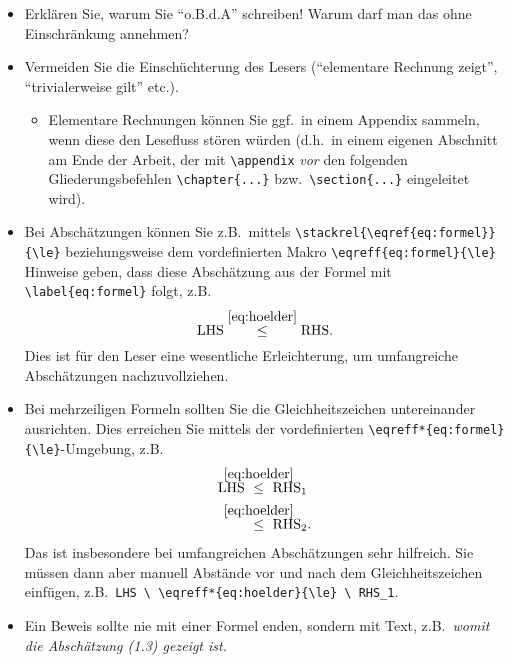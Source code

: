 \documentclass[../main.tex]{subfiles}
\begin{document}
\begin{itemize}
  \item Erklären Sie, warum Sie "`o.B.d.A"' schreiben! Warum darf man das ohne Einschrän\-kung annehmen?

  \item Vermeiden Sie die Einschüchterung des Lesers ("`elementare Rechnung zeigt"', "`trivialerweise gilt"' etc.).
        \begin{itemize}
          \item Elementare Rechnungen können Sie ggf.\ in einem Appendix sammeln, wenn diese den Lesefluss stören würden (d.h.\ in einem eigenen Abschnitt am Ende der Arbeit, der mit \verb$\appendix$ \emph{vor} den folgenden Gliederungsbefehlen \verb$\chapter{...}$ bzw.\ \verb$\section{...}$ eingeleitet wird).
        \end{itemize}

  \item Bei Abschätzungen können Sie z.B.\ mittels \verb$\stackrel{\eqref{eq:formel}}{\le}$ beziehungsweise dem vordefinierten Makro \verb$\eqreff{eq:formel}{\le}$ Hinweise geben, dass diese Abschätzung aus der Formel mit \verb$\label{eq:formel}$ folgt, z.B.
        \begin{equation*}
          \textup{LHS} \eqreff{eq:hoelder}{\le} \textup{RHS}.
        \end{equation*}
        Dies ist für den Leser eine wesentliche Erleichterung, um umfangreiche Abschätzungen nachzuvollziehen.

  \item Bei mehrzeiligen Formeln sollten Sie die Gleichheitszeichen untereinander ausrichten. Dies erreichen Sie mittels der vordefinierten \verb$\eqreff*{eq:formel}{\le}$-Umgebung, z.B.
        \begin{align*}
          \textup{LHS} \  & \eqreff*{eq:hoelder}{\le} \ \textup{RHS}_1  \\
                          & \eqreff*{eq:hoelder}{\le} \ \textup{RHS}_2.
        \end{align*}
        Das ist insbesondere bei umfangreichen Abschätzungen sehr hilfreich. Sie müssen dann aber
        manuell Abstände vor und nach dem Gleichheitszeichen einfügen, z.B.\ \verb$LHS \ \eqreff*{eq:hoelder}{\le} \ RHS_1$.

  \item Ein Beweis sollte nie mit einer Formel enden, sondern mit Text, z.B.\ \emph{womit die Abschätzung {\normalfont(1.3)} gezeigt ist.}
\end{itemize}
\end{document}
